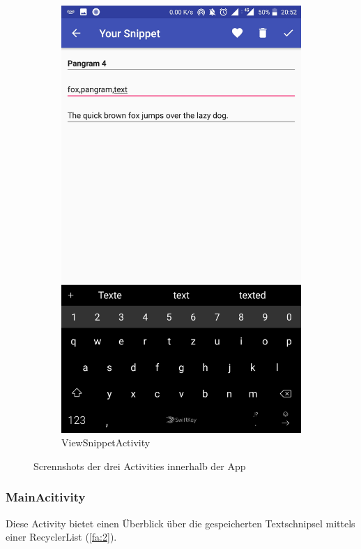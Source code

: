 \documentclass[11pt]{article}
\begin{document}
\begin{figure}
		\begin{subfigure}[b]{0.3\textwidth}
			\includegraphics[width=\textwidth]{Konzepte/screenshots/edit_snippet.jpg}
			\caption{ViewSnippetActivity}
		\end{subfigure}
		\caption{Scrennshots der drei Activities innerhalb der App}
		\label{fig:activities}
	\end{figure}
	
	\subsubsection{MainAcitivity}
	\label{sec:main}
	Diese Activity bietet einen Überblick über die gespeicherten Textschnipsel mittels einer RecyclerList (\ref{fa:2}).\newline
	
\end{document}

